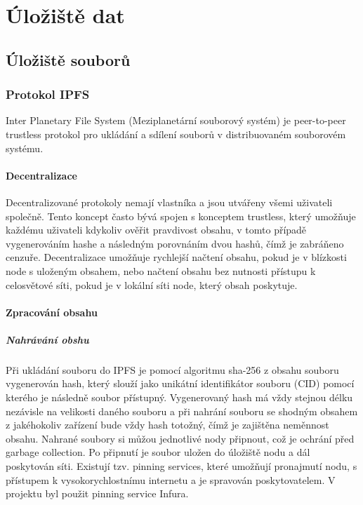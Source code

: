 \documentclass[12pt, a4paper,
 twoside,        %
 openright
]{report}
\begin{document}
\chapter{Úložiště dat}
    \section{Úložiště souborů}
        \subsection{Protokol IPFS}
        Inter Planetary File System (Meziplanetární souborový systém) je peer-to-peer trustless protokol pro ukládání a sdílení souborů v distribuovaném souborovém systému.
        \subsubsection{Decentralizace}
            Decentralizované protokoly nemají vlastníka a jsou utvářeny všemi uživateli společně. Tento koncept často bývá spojen s konceptem trustless, který umožňuje každému uživateli kdykoliv ověřit pravdivost obsahu, v tomto případě vygenerováním hashe a následným porovnáním dvou hashů, čímž je zabráňeno cenzuře. Decentralizace umožňuje rychlejší načtení obsahu, pokud je v blízkosti node s uloženým obsahem, nebo načtení obsahu bez nutnosti přístupu k celosvětové síti, pokud je v lokální síti node, který obsah poskytuje.
        \subsubsection{Zpracování obsahu}
            \paragraph{Nahrávání obshu}
            Při ukládání souboru do IPFS je pomocí algoritmu sha-256 z obsahu souboru vygenerován hash, který slouží jako unikátní identifikátor souboru (CID) pomocí kterého je následně soubor přístupný. Vygenerovaný hash má vždy stejnou délku nezávisle na velikosti daného souboru a při nahrání souboru se shodným obsahem z jakéhokoliv zařízení bude vždy hash totožný, čímž je zajištěna neměnnost obsahu. Nahrané soubory si můžou jednotlivé nody připnout, což je ochrání před garbage collection. Po připnutí je soubor uložen do úložiště nodu a dál poskytován síti. Existují tzv. pinning services, které umožňují pronajmutí nodu, s přístupem k vysokorychlostnímu internetu a je spravován poskytovatelem. V projektu byl použit pinning service Infura. 
\end{document}
